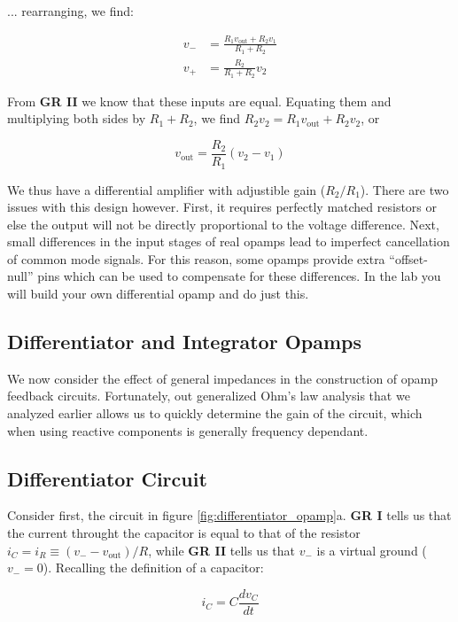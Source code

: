 \documentclass{tufte-book}
\begin{document}
\noindent ... rearranging, we find:

\begin{align}
v_- &= \frac{R_1v_\text{out} + R_2v_1}{R_1+R_2} \\
v_+ &= \frac{R_2}{R_1+R_2}v_2
\end{align}



From \textbf{GR II} we know that these inputs are equal. Equating them and multiplying both sides by $R_1 + R_2$, we find $R_2v_2 = R_1v_\text{out} + R_2v_2$, or

\begin{equation}
\label{eq:differential_opamp}
v_\text{out} = \frac{R_2}{R_1}\left(v_2-v_1\right)
\end{equation}

We thus have a differential amplifier with adjustible gain ($R_2/R_1$). There are two issues with this design however. First, it requires perfectly matched resistors or else the output will not be directly proportional to the voltage difference. Next, small differences in the input stages of real opamps lead to imperfect cancellation of common mode signals. For this reason, some opamps provide extra ``offset-null'' pins which can be used to compensate for these differences. In the lab you will build your own differential opamp and do just this.

\subsection{Differentiator and Integrator Opamps}
We now consider the effect of general impedances in the construction of opamp feedback circuits. Fortunately, out generalized Ohm's law analysis that we analyzed earlier allows us to quickly determine the gain of the circuit, which when using reactive components is generally frequency dependant. 

\subsection{Differentiator Circuit}
Consider first, the circuit in figure \ref{fig:differentiator_opamp}a. \textbf{GR I} tells us that the current throught the capacitor is equal to that of the resistor $i_C = i_R \equiv \left(v_--v_\text{out}\right)/R$, while \textbf{GR II} tells us that $v_-$ is a virtual ground ($v_- = 0$). Recalling the definition of a capacitor:

\begin{equation}
\label{eq:defn_capacitor_rep}
i_C = C\frac{dv_C}{dt}
\end{equation}
\end{document}
